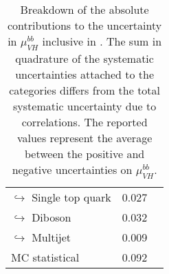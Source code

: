 \begin{table}[tb]
\begin{center}
\begin{tabular}{ l | l  c c }
        \multicolumn{2}{l}{$\hookrightarrow$ Single top quark} & 0.027 \\
        \multicolumn{2}{l}{$\hookrightarrow$ Diboson} & 0.032 \\
        \multicolumn{2}{l}{$\hookrightarrow$ Multijet} & 0.009 \\
        \midrule
        \multicolumn{2}{l}{MC statistical} & 0.092 \\
        \bottomrule
    \end{tabular}
    \end{center}
    \caption{
        Breakdown of the absolute contributions to the uncertainty in $\mu_{VH}^{bb}$ inclusive in \pTV. 
        The sum in quadrature of the systematic uncertainties attached to the categories differs from the total systematic uncertainty due to correlations. 
        The reported values represent the average between the positive and negative uncertainties on $\mu_{VH}^{bb}$.
    }
    \label{tab:mu_syst_unc}
\end{table}
    
